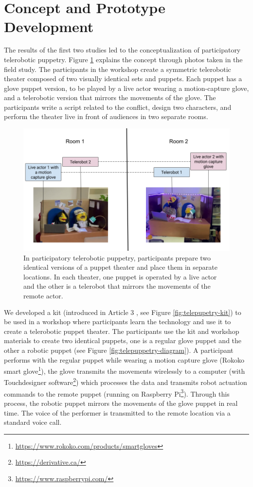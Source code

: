 \documentclass[dissertation,math,vertlayout,pdfa,colorlinks,nologo]{aaltoseries}
\begin{document}
\section{Concept and Prototype Development}
The results of the first two studies led to the conceptualization of participatory telerobotic puppetry. Figure \ref{fig:telerobotic_puppetry} explains the concept through photos taken in the field study. The participants in the workshop create a symmetric telerobotic theater composed of two visually identical sets and puppets. Each puppet has a glove puppet version, to be played by a live actor wearing a motion-capture glove, and a telerobotic version that mirrors the movements of the glove. The participants write a script related to the conflict, design two characters, and perform the theater live in front of audiences in two separate rooms.


\begin{figure}
    \centering
    \includegraphics[width=1\linewidth]{Telerobotic puppetry.png}
    \caption{In participatory telerobotic puppetry, participants prepare two identical versions of a puppet theater and place them in separate locations. In each theater, one puppet is operated by a live actor and the other is a telerobot that mirrors the movements of the remote actor.}
    \label{fig:telerobotic_puppetry}
\end{figure}

We developed a kit (introduced in Article 3 \cite{peledTeleroboticTheaterOppressed2025}, see Figure \ref{fig:telepupetry-kit}) to be used in a workshop where participants learn the technology and use it to create a telerobotic puppet theater. The participants use the kit and workshop materials to create two identical puppets, one is a regular glove puppet and the other a robotic puppet (see Figure \ref{fig:telepuppetry-diagram}). A participant performs with the regular puppet while wearing a motion capture glove (Rokoko smart glove\footnote{\url{https://www.rokoko.com/products/smartgloves}}), the glove transmits the movements wirelessly to a computer (with Touchdesigner software\footnote{\url{https://derivative.ca/}}) which processes the data and transmits robot actuation commands to the remote puppet (running on Raspberry Pi\footnote{\url{https://www.raspberrypi.com/}}). Through this process, the robotic puppet mirrors the movements of the glove puppet in real time. The voice of the performer is transmitted to the remote location via a standard voice call.
\end{document}
